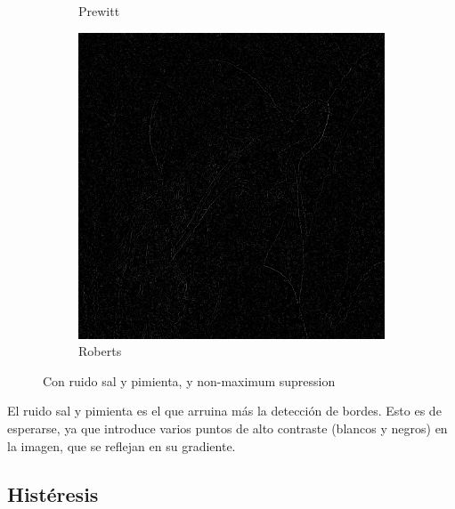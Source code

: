 \documentclass[a4paper]{article}
\begin{document}
\begin{figure}[H]
\begin{subfigure}[t]{0.3\textwidth}
	\caption{Prewitt}
	\end{subfigure}
	\begin{subfigure}[t]{0.3\textwidth}
	\centering
	\includegraphics[width=\textwidth]{imagenesInforme/lenaNonMaximumSupressionSaltAndPepperRoberts}
	\caption{Roberts}
	\end{subfigure}
\caption{Con ruido sal y pimienta, y non-maximum supression}
\end{figure}

El ruido sal y pimienta es el que arruina más la detección de bordes. Esto es de esperarse, ya que introduce varios puntos de alto contraste (blancos y negros) en la imagen, que se reflejan en su gradiente.

\subsection*{Histéresis}
\end{document}
